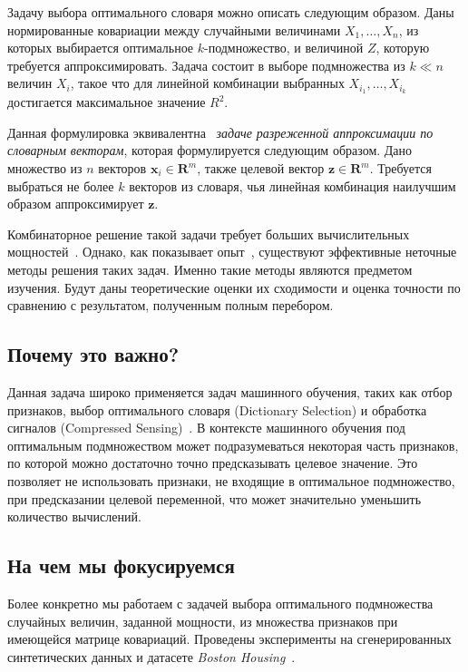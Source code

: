 \documentclass[preprint,12pt]{elsarticle}
\begin{document}
Задачу выбора оптимального словаря можно описать следующим образом. 
Даны нормированные ковариации между случайными величинами $X_1, \dots, X_n$, из которых выбирается оптимальное $k$-подмножество, и величиной $Z$, которую требуется аппроксимировать. 
Задача состоит в выборе подмножества из $k \ll n$ величин $X_i$, такое что для линейной комбинации выбранных $X_{i_1}, \dots, X_{i_k}$ достигается максимальное значение $R^2$.

Данная формулировка эквивалентна~\cite{das2008algorithms} \textit{задаче разреженной аппроксимации по словарным векторам}, которая формулируется следующим образом. Дано множество из $n$ векторов $\textbf{x}_i \in \mathbf{R}^m$, также целевой вектор $\textbf{z} \in \mathbf{R}^m$. Требуется выбраться не более $k$ векторов из словаря, чья линейная комбинация наилучшим образом аппроксимирует $\textbf{z}$.

Комбинаторное решение такой задачи требует больших вычислительных мощностей~\cite{chen2008np}. Однако, как показывает опыт~\cite{bian2017guarantees, lovasz1983submodular}, существуют эффективные неточные методы решения таких задач. Именно такие методы являются предметом изучения. Будут даны теоретические оценки их сходимости и оценка точности по сравнению с результатом, полученным полным перебором.

\subsection{Почему это важно?}
Данная задача широко применяется задач машинного обучения, таких как отбор признаков, выбор оптимального словаря (Dictionary Selection) \cite{krause2010submodular} и обработка сигналов (Compressed Sensing)~\cite{coutino2018submodular}. В контексте машинного обучения под оптимальным подмножеством может подразумеваться некоторая часть признаков, по которой можно достаточно точно предсказывать целевое значение. Это позволяет не использовать признаки, не входящие в оптимальное подмножество, при предсказании целевой переменной, что может значительно уменьшить количество вычислений.

\subsection{На чем мы фокусируемся}
Более конкретно мы работаем с задачей выбора оптимального подмножества случайных величин, заданной мощности, из множества признаков при имеющейся матрице ковариаций. Проведены эксперименты на сгенерированных синтетических данных и датасете \textit{Boston Housing}~\cite{boston}.
\end{document}
